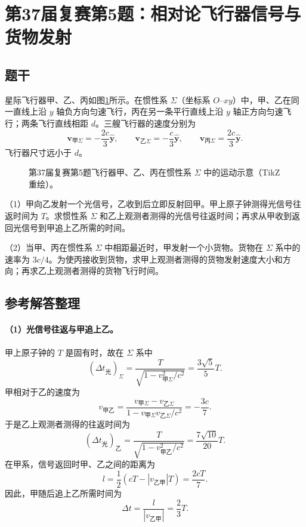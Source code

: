 \section{第37届复赛第5题：相对论飞行器信号与货物发射}

\subsection{题干}
星际飞行器甲、乙、丙如图\ref{fig:cpho37q05}所示。在惯性系 $\Sigma$（坐标系 $O$--$xy$）中，甲、乙在同一直线上沿 $y$ 轴负方向匀速飞行，丙在另一条平行直线上沿 $y$ 轴正方向匀速飞行；两条飞行直线相距 $d$。三艘飞行器的速度分别为
\[
\boldsymbol v_{\text{甲}\Sigma}=-\frac{2c}{3}\hat{\boldsymbol y},\qquad
\boldsymbol v_{\text{乙}\Sigma}=-\frac{c}{3}\hat{\boldsymbol y},\qquad
\boldsymbol v_{\text{丙}\Sigma}=\frac{2c}{3}\hat{\boldsymbol y}.
\]
飞行器尺寸远小于 $d$。
\begin{figure}[htbp]\centering

\caption{第37届复赛第5题飞行器甲、乙、丙在惯性系 $\Sigma$ 中的运动示意（TikZ 重绘）。}\label{fig:cpho37q05}
\end{figure}

（1）甲向乙发射一个光信号，乙收到后立即反射回甲。甲上原子钟测得光信号往返时间为 $T$。求惯性系 $\Sigma$ 和乙上观测者测得的光信号往返时间；再求从甲收到返回光信号到甲追上乙所需的时间。

（2）当甲、丙在惯性系 $\Sigma$ 中相距最近时，甲发射一个小货物。货物在 $\Sigma$ 系中的速率为 $3c/4$。为使丙接收到货物，求甲上观测者测得的货物发射速度大小和方向；再求乙上观测者测得的货物飞行时间。

\subsection{参考解答整理}
\paragraph{（1）光信号往返与甲追上乙。}
甲上原子钟的 $T$ 是固有时，故在 $\Sigma$ 系中
\[
\boxed{(\Delta t_{\text{光}})_\Sigma
=\frac{T}{\sqrt{1-v_{\text{甲}\Sigma}^2/c^2}}
=\frac{3\sqrt5}{5}T.}
\]
甲相对于乙的速度为
\[
v_{\text{甲乙}}
=\frac{v_{\text{甲}\Sigma}-v_{\text{乙}\Sigma}}
{1-v_{\text{甲}\Sigma}v_{\text{乙}\Sigma}/c^2}
=-\frac{3c}{7}.
\]
于是乙上观测者测得的往返时间为
\[
\boxed{(\Delta t_{\text{光}})_\text{乙}
=\frac{T}{\sqrt{1-v_{\text{甲乙}}^2/c^2}}
=\frac{7\sqrt{10}}{20}T.}
\]
在甲系，信号返回时甲、乙之间的距离为
\[
l=\frac12\left(cT-\left|v_{\text{乙甲}}\right|T\right)=\frac{2cT}{7}.
\]
因此，甲随后追上乙所需时间为
\[
\boxed{\Delta t=\frac{l}{|v_{\text{乙甲}}|}=\frac23T.}
\]

